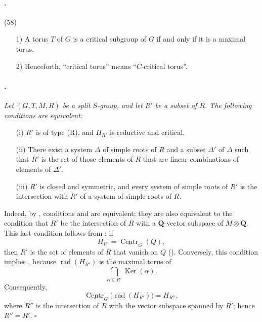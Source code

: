 \paragraph{.}
\textup{(58)}
\begin{enumerate}
\item[\textup{1)}] A torus \(T\) of \(G\) is a critical subgroup of
\(G\) if and only if it is a maximal torus.
\item[\textup{2)}] Henceforth, ``critical torus'' means
``\(C\)-critical torus''.
\end{enumerate}

\paragraph{.}
{\itshape Let \((G,T,M,R)\) be a split \(S\)-group, and let
\(R'\) be a subset of \(R\). The following conditions are
equivalent:
\begin{enumerate}
\item[\textup{\SGAInlineRefTarget{sga3:xxii:prop:5.10.6:item:i}(i)}] \(R'\) is of type \textup{(R)}, and \(H_{R'}\)
is reductive and critical.

\item[\textup{(ii)}] There exist a system \(\Delta\) of simple
roots of \(R\) and a subset \(\Delta'\) of \(\Delta\) such that
\(R'\) is the set of those elements of \(R\) that are linear
combinations of elements of \(\Delta'\).

\item[\textup{\SGAInlineRefTarget{sga3:xxii:prop:5.10.6:item:iii}(iii)}] \(R'\) is closed and symmetric, and every
system of simple roots of \(R'\) is the intersection with \(R'\) of
a system of simple roots of \(R\).
\end{enumerate}}

Indeed, by , conditions \textup{} and
\textup{} are equivalent; they are also equivalent to the
condition that \(R'\) be the intersection of \(R\) with a
\(\mathbf Q\)-vector subspace of \(M\otimes\mathbf Q\). This last
condition follows from \textup{}: if
\[
  H_{R'}=\underline{\operatorname{Centr}}_G(Q),
\]
then \(R'\) is the set of elements of \(R\) that vanish on \(Q\)
\textup{()}. Conversely, this condition implies
\textup{}, because \(\operatorname{rad}(H_{R'})\) is the maximal
torus of
\[
  \bigcap_{\alpha\in R'}\operatorname{Ker}(\alpha).
\]
Consequently,
\[
  \underline{\operatorname{Centr}}_G\bigl(
    \operatorname{rad}(H_{R'})\bigr)
  =
  H_{R''},
\]
where \(R''\) is the intersection of \(R\) with the vector subspace
spanned by \(R'\); hence \(R''=R'\).
\hfill\(\square\)

